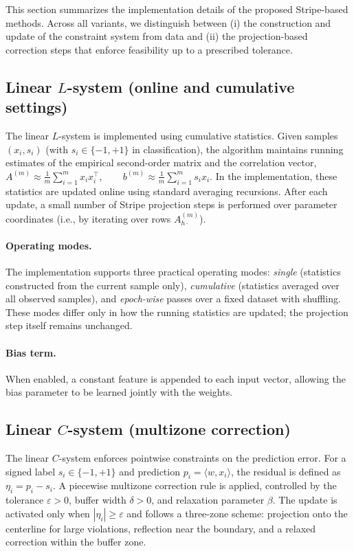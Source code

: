 \documentclass[a4paper,fleqn]{cas-sc}
\begin{document}
This section summarizes the implementation details of the proposed Stripe-based methods.
Across all variants, we distinguish between
(i) the construction and update of the constraint system from data
and (ii) the projection-based correction steps that enforce feasibility up to a prescribed tolerance.

\subsection{Linear $L$-system (online and cumulative settings)}
\label{subsec:impl_linear_L}

The linear $L$-system is implemented using cumulative statistics.
Given samples $(x_i, s_i)$ (with $s_i\in\{-1,+1\}$ in classification),
the algorithm maintains running estimates of the empirical second-order matrix
and the correlation vector,
$
A^{(m)} \approx \frac{1}{m}\sum_{i=1}^m x_i x_i^\top,
\qquad
b^{(m)} \approx \frac{1}{m}\sum_{i=1}^m s_i x_i .
$
In the implementation, these statistics are updated online using standard averaging recursions.
After each update, a small number of Stripe projection steps is performed over parameter coordinates
(i.e., by iterating over rows $A^{(m)}_{h\cdot}$).

\paragraph{Operating modes.}
The implementation supports three practical operating modes:
\emph{single} (statistics constructed from the current sample only),
\emph{cumulative} (statistics averaged over all observed samples),
and \emph{epoch-wise} passes over a fixed dataset with shuffling.
These modes differ only in how the running statistics are updated;
the projection step itself remains unchanged.


\paragraph{Bias term.}
When enabled, a constant feature is appended to each input vector,
allowing the bias parameter to be learned jointly with the weights.

\subsection{Linear $C$-system (multizone correction)}
\label{subsec:impl_linear_C}

The linear $C$-system enforces pointwise constraints on the prediction error.
For a signed label $s_i\in\{-1,+1\}$ and prediction $p_i=\langle w, x_i\rangle$,
the residual is defined as $\eta_i = p_i - s_i$.
A piecewise multizone correction rule is applied,
controlled by the tolerance $\varepsilon>0$,
buffer width $\delta>0$, and relaxation parameter $\beta$.
The update is activated only when $|\eta_i|\ge \varepsilon$
and follows a three-zone scheme:
projection onto the centerline for large violations,
reflection near the boundary,
and a relaxed correction within the buffer zone.
\end{document}

